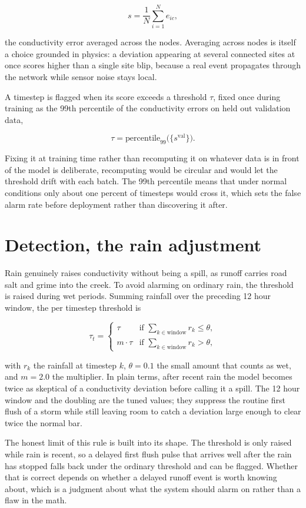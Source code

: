 \documentclass[11pt]{article}
\begin{document}
\[
s = \frac{1}{N} \sum_{i=1}^{N} e_{ic},
\]

the conductivity error averaged across the nodes. Averaging across nodes is itself a choice grounded in physics: a deviation appearing at several connected sites at once scores higher than a single site blip, because a real event propagates through the network while sensor noise stays local.

A timestep is flagged when its score exceeds a threshold $\tau$, fixed once during training as the 99th percentile of the conductivity errors on held out validation data,

\[
\tau = \text{percentile}_{99}\big( \{ s^{\text{val}} \} \big).
\]

Fixing it at training time rather than recomputing it on whatever data is in front of the model is deliberate, recomputing would be circular and would let the threshold drift with each batch. The 99th percentile means that under normal conditions only about one percent of timesteps would cross it, which sets the false alarm rate before deployment rather than discovering it after.

\section*{Detection, the rain adjustment}

Rain genuinely raises conductivity without being a spill, as runoff carries road salt and grime into the creek. To avoid alarming on ordinary rain, the threshold is raised during wet periods. Summing rainfall over the preceding 12 hour window, the per timestep threshold is

\[
\tau_t =
\begin{cases}
\tau & \text{if } \sum_{k \in \text{window}} r_k \le \theta, \\[4pt]
m \cdot \tau & \text{if } \sum_{k \in \text{window}} r_k > \theta,
\end{cases}
\]

with $r_k$ the rainfall at timestep $k$, $\theta = 0.1$ the small amount that counts as wet, and $m = 2.0$ the multiplier. In plain terms, after recent rain the model becomes twice as skeptical of a conductivity deviation before calling it a spill. The 12 hour window and the doubling are the tuned values; they suppress the routine first flush of a storm while still leaving room to catch a deviation large enough to clear twice the normal bar.

The honest limit of this rule is built into its shape. The threshold is only raised while rain is recent, so a delayed first flush pulse that arrives well after the rain has stopped falls back under the ordinary threshold and can be flagged. Whether that is correct depends on whether a delayed runoff event is worth knowing about, which is a judgment about what the system should alarm on rather than a flaw in the math.
\end{document}
